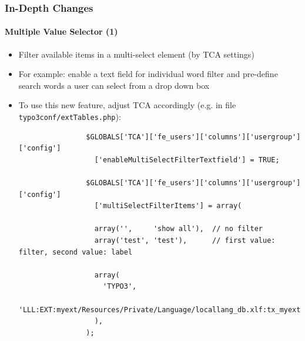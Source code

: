 \begin{frame}[fragile]
	\frametitle{In-Depth Changes}
	\framesubtitle{Multiple Value Selector (1)}

	\lstset{
		basicstyle=\tiny\ttfamily
	}

	\begin{itemize}
		\item Filter available items in a multi-select element (by TCA settings)
		\item For example: enable a text field for individual word filter and pre-define search words a user can select from a drop down box

		\item To use this new feature, adjust TCA accordingly\newline
			(e.g. in file \texttt{typo3conf/extTables.php}):


			\begin{lstlisting}
				$GLOBALS['TCA']['fe_users']['columns']['usergroup']['config']
				  ['enableMultiSelectFilterTextfield'] = TRUE;

				$GLOBALS['TCA']['fe_users']['columns']['usergroup']['config']
				  ['multiSelectFilterItems'] = array(

				  array('',     'show all'),  // no filter
				  array('test', 'test'),      // first value: filter, second value: label

				  array(
				    'TYPO3',
				    'LLL:EXT:myext/Resources/Private/Language/locallang_db.xlf:tx_myext.label.typo3'
				  ),
				);
			\end{lstlisting}

	\end{itemize}

\end{frame}


